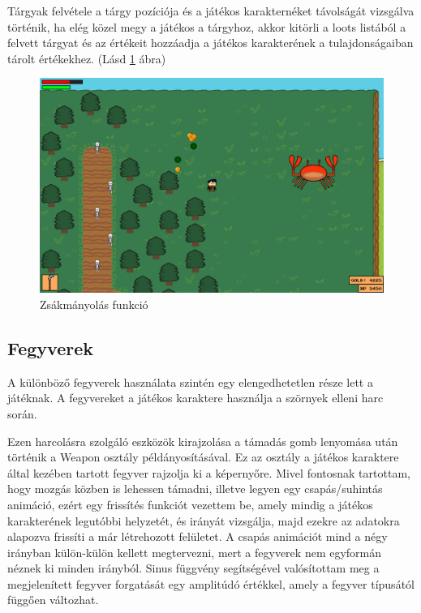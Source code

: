 Tárgyak felvétele a tárgy pozíciója és a játékos karakternéket távolságát vizsgálva történik, ha elég közel megy a játékos a tárgyhoz, akkor kitörli a loots listából a felvett tárgyat és az értékeit hozzáadja a játékos karakterének a tulajdonságaiban tárolt értékekhez. (Lásd \ref{fig:Zsákmányolás funkció} ábra)

\begin{figure}[H]
    \centering
    \includegraphics[width=15.5truecm]{images/loots.png}
    \caption{Zsákmányolás funkció}
    \label{fig:Zsákmányolás funkció}
\end{figure}


\subsection{Fegyverek}

\indent \indent A különböző fegyverek használata szintén egy elengedhetetlen része lett a játéknak. A fegyvereket a játékos karaktere használja a szörnyek elleni harc során. 

Ezen harcolásra szolgáló eszközök kirajzolása a támadás gomb lenyomása után történik a Weapon osztály példányosításával. Ez az osztály a játékos karaktere által kezében tartott fegyver rajzolja ki a képernyőre. Mivel fontosnak tartottam, hogy mozgás közben is lehessen támadni, illetve legyen egy csapás/suhintás animáció, ezért egy frissítés funkciót vezettem be, amely mindig a játékos karakterének legutóbbi helyzetét, és irányát vizsgálja, majd ezekre az adatokra alapozva frissíti a már létrehozott felületet. A csapás animációt mind a négy irányban külön-külön kellett megtervezni, mert a fegyverek nem egyformán néznek ki minden irányból. Sinus függvény segítségével valósítottam meg a megjelenített fegyver forgatását egy amplitúdó értékkel, amely a fegyver típusától függően változhat.

